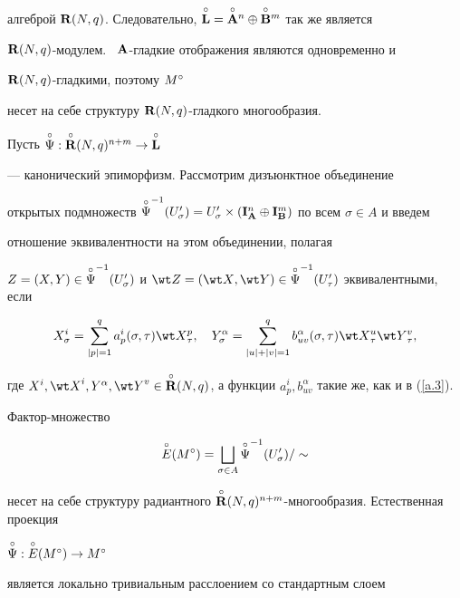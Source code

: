 \begin{pf}
алгеброй ${\R}(N,q)$. Следовательно, $\Lo=\overset{\circ}{\bold A}{}^n\oplus


\overset{\circ}{\bold B}{}^m$ так же является


${{\bold R}}(N,q)$-модулем. \ ${\bold A}$-гладкие отображения являются одновременно и


${\bold R}(N,q)$-гладкими, поэтому ${M^\circ}$


несет на себе структуру ${\bold R}(N,q)$-гладкого многообразия.


Пусть $\overset{\circ}{\Psi}{}:\overset{\circ}{{\bold R}}{}(N,q)^{n+m}\to\overset{\circ}{\bold L}{}$


--- канонический эпиморфизм. Рассмотрим дизъюнктное объединение


открытых подмножеств $\Psiom(U'_\sigma)=U'_\sigma


\times(\I^n_\A\oplus\I^m_\B)$ по всем $\sigma\in A$ и введем


отношение эквивалентности на этом объединении, полагая


${Z}=({X},{Y})\in\Psiom(U'_\sigma)$ и ${\wt Z}=({\wt X},


{\wt Y})\in\Psiom(U'_\tau)$ эквивалентными, если


$$


{X}^i_\sigma=\sum^q_{|p|=1}


a^i_p(\sigma,\tau){\wt X}{}^p_\tau, \quad


{Y}^\alpha_\sigma=\sum^q_{|u|+|v|=1}


b^\alpha_{uv}(\sigma,\tau){\wt X}{}^u_\tau


{\wt Y}{}^v_\tau,


$$


где ${X}^i, {\wt X}^i, {Y}^\alpha,


{\wt Y}^v \in \puto{\R}(N,q)$, а функции $a^i_p,


b^\alpha_{uv}$ такие же, как и в (\ref{a.3}).


Фактор-множество


$$


\puto{E}({\Mo})=


\bigsqcup_{\sigma\in A}\Psiom( U'_\sigma)/\sim


$$


несет на себе структуру радиантного $\puto{\R}


(N,q)^{n+m}$-многообразия. Естественная проекция \linebreak


$\overset{\circ}{\Psi}{} : \overset{\circ}{E}{}({M^\circ})\to{M^\circ}$


является локально тривиальным расслоением со стандартным слоем



\end{pf}
